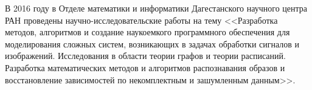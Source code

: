 \Conclusion

В 2016 году в Отделе математики и информатики Дагестанского научного центра РАН проведены научно-исследовательские работы на тему
<<Разработка методов, алгоритмов и создание наукоемкого программного обеспечения для моделирования сложных систем, возникающих в задачах обработки сигналов и изображений. Исследования в области теории графов и теории расписаний.
Разработка математических методов и алгоритмов распознавания образов и восстановление зависимостей по некомплектным и зашумленным данным>>.








